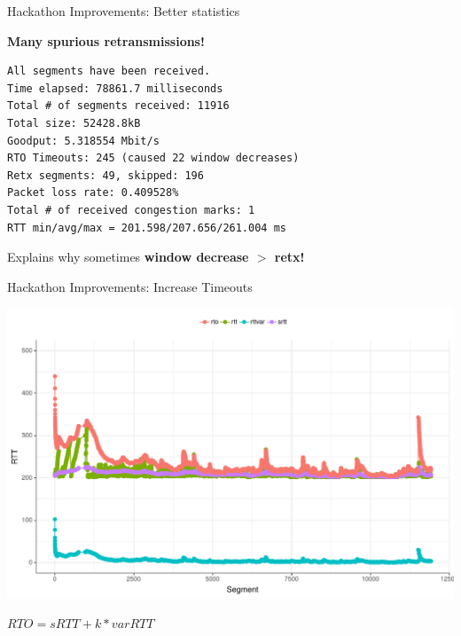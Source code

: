 \begin{frame}[fragile]{Hackathon Improvements: Better statistics}

\textbf{Many spurious retransmissions!}
\vspace*{-.5em}

\footnotesize
\begin{verbatim}
All segments have been received.
Time elapsed: 78861.7 milliseconds
Total # of segments received: 11916
Total size: 52428.8kB
Goodput: 5.318554 Mbit/s
RTO Timeouts: 245 (caused 22 window decreases)
Retx segments: 49, skipped: 196
Packet loss rate: 0.409528%
Total # of received congestion marks: 1
RTT min/avg/max = 201.598/207.656/261.004 ms
\end{verbatim}

\normalsize

\pause
Explains why sometimes \textbf{window decrease $>$ retx!}



\end{frame}


\begin{frame}[fragile]{Hackathon Improvements: Increase Timeouts }

\includegraphics[width=\linewidth]{images/rtt_rto200ms.pdf}

$RTO = sRTT + k * varRTT$

\end{frame}



